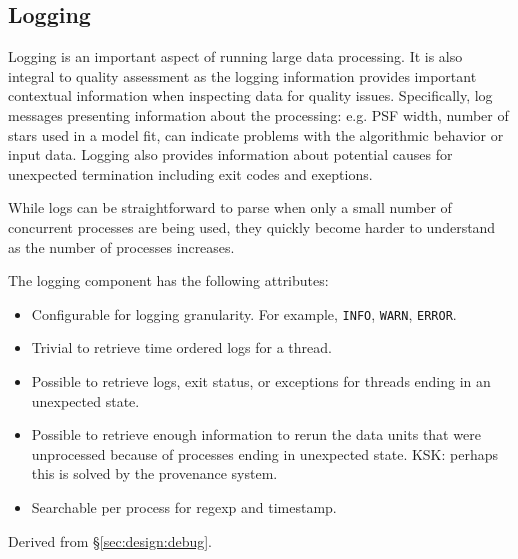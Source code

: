\subsection{Logging}


Logging is an important aspect of running large data processing.
It is also integral to quality assessment as the logging information provides important contextual information when inspecting data for quality issues.
Specifically, log messages presenting information about the processing: e.g. PSF width, number of stars used in a model fit, can indicate problems with the algorithmic behavior or input data.
Logging also provides information about potential causes for unexpected termination including exit codes and exeptions.

While logs can be straightforward to parse when only a small number of concurrent processes are being used, they quickly become harder to understand as the number of processes increases.

The logging component has the following attributes:
\begin{itemize}
\item Configurable for logging granularity. For example, \texttt{INFO}, \texttt{WARN}, \texttt{ERROR}.
\item Trivial to retrieve time ordered logs for a thread.
\item Possible to retrieve logs, exit status, or exceptions for threads ending in an unexpected state.
\item Possible to retrieve enough information to rerun the data units that were unprocessed because of processes ending in unexpected state.  KSK: perhaps this is solved by the provenance system.
\item Searchable per process for regexp and timestamp.
\end{itemize}

Derived from \S\ref{sec:design:debug}.
